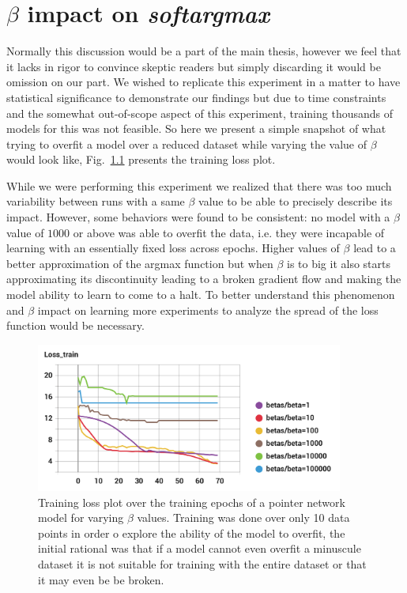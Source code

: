 \chapter{$\beta$ impact on \textit{softargmax}}
\label{ap:beta}


Normally this discussion would be a part of the main thesis, however we feel that it lacks in rigor to convince skeptic readers but simply discarding it would be omission on our part. We wished to replicate this experiment in a matter to have statistical significance to demonstrate our findings but due to time constraints and the somewhat out-of-scope aspect of this experiment, training thousands of models for this was not feasible. So here we present a simple snapshot of what trying to overfit a model over a reduced dataset while varying the value of $\beta$ would look like, Fig.~\ref{beta_loss} presents the training loss plot.

While we were performing this experiment we realized that there was too much variability between runs with a same $\beta$ value to be able to precisely describe its impact. However, some behaviors were found to be consistent: no model with a $\beta$ value of $1000$ or above was able to overfit the data, i.e. they were incapable of learning with an essentially fixed loss across epochs. Higher values of $\beta$ lead to a better approximation of the argmax function but when $\beta$ is to big it also starts approximating its discontinuity leading to a broken gradient flow and making the model ability to learn to come to a halt. To better understand this phenomenon and $\beta$ impact on learning more experiments to analyze the spread of the loss function would be necessary.



\begin{figure}[!ht]
\centerline{\includegraphics[width=0.9\textwidth]{figuras/betas_-Loss.png}   }
\caption{Training loss plot over the training epochs of a pointer network model for varying $\beta$ values. Training was done over only 10 data points in order o explore the ability of the model to overfit, the initial rational was that if a model cannot even overfit a minuscule dataset it is not suitable for training with the entire dataset or that it may even be be broken.}
\label{beta_loss}
\end{figure}